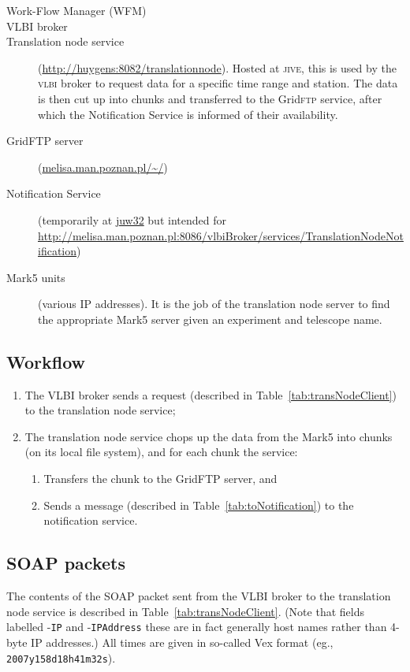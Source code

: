 \documentclass[11pt]{article}
\begin{document}
\begin{description}
  \item[Work-Flow Manager (WFM)]
  \item[VLBI broker] 
  \item[Translation node service]
    (\url{http://huygens:8082/translationnode}).  Hosted at
    \textsc{jive}, this is used by the \textsc{vlbi} broker to request
    data for a specific time range and station.  The data is then cut
    up into chunks and transferred to the Grid\textsc{ftp} service,
    after which the Notification Service is informed of their availability.
  \item[GridFTP server] (\url{melisa.man.poznan.pl/~/})
  \item[Notification Service]  (temporarily at \url{juw32} but intended for 
     \url{http://melisa.man.poznan.pl:8086/vlbiBroker/services/TranslationNodeNotification})
  \item[Mark5 units] (various IP addresses). It is the job of the
    translation node server to find the appropriate Mark5 server given an
    experiment and telescope name.
\end{description}

\subsection{Workflow}

\begin{enumerate}
\item The VLBI broker sends a request (described in
  Table~\ref{tab:transNodeClient}) to the translation node 
  service;
\item The translation node service chops up the data from the Mark5 into
  chunks (on its local file system), and for each chunk the service:
  \begin{enumerate}
    \item Transfers the chunk to the GridFTP server, and 
    \item Sends a message (described in Table~\ref{tab:toNotification}) to
      the notification service. 
  \end{enumerate}
\end{enumerate}

\subsection{SOAP packets}
The contents of the SOAP packet sent from the VLBI broker to the
translation node service is described in
Table~\ref{tab:transNodeClient}.  (Note that fields labelled
-\texttt{IP} and -\texttt{IPAddress} these are in fact generally host
names rather than 4-byte IP addresses.)  All times are given in
so-called Vex format (eg., \texttt{2007y158d18h41m32s}).
\end{document}
